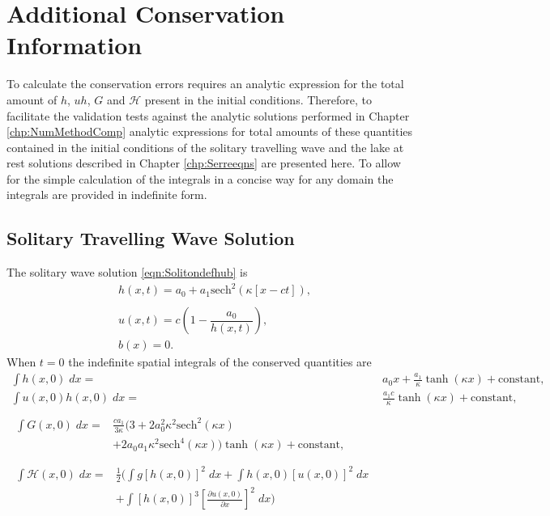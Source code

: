 \chapter{Additional Conservation Information}
\label{app:ConQuant}
To calculate the conservation errors requires an analytic expression for the total amount of $h$, $uh$, $G$ and $\mathcal{H}$ present in the initial conditions. Therefore, to facilitate the validation tests against the analytic solutions performed in Chapter \ref{chp:NumMethodComp} analytic expressions for total amounts of these quantities contained in the initial conditions of the solitary travelling wave and the lake at rest solutions described in Chapter \ref{chp:Serreeqns} are presented here. To allow for the simple calculation of the integrals in a concise way for any domain the integrals are provided in indefinite form. 

\section{Solitary Travelling Wave Solution}
The solitary wave solution \eqref{eqn:Solitondefhub} is
	\begin{align*}
	&h(x,t) = a_0 + a_1\text{sech}^2\left(\kappa \left[x - ct\right]\right), \\  \nonumber \\
	&u(x,t) = c\left(1 - \dfrac{a_0}{h(x,t)}\right), \\
	&b(x) = 0.
	\end{align*}
\begingroup
When $t=0$ the indefinite spatial integrals of the conserved quantities are
\allowdisplaybreaks
\begin{subequations}
	\begin{align}
	\int h(x,0) \; dx = {} & a_0 x + \frac{a_1}{\kappa} \tanh\left(\kappa x\right) + \text{constant}, \label{eqn:SolitonConservationh} \\
	\int u(x,0)h(x,0) \;  dx = {} & \frac{a_1 c}{\kappa} \tanh\left(\kappa x\right)+ \text{constant}, \label{eqn:SolitonConservationuh} \\  \nonumber \\
	\begin{split}
	\int G(x,0) \; dx = {}&  \frac{c a_1}{3 \kappa}  \Bigg(3 + 2a_0^2 \kappa^2\text{sech}^2\left(\kappa x\right)  \\ &+ 2a_0 a_1 \kappa^2 \text{sech}^4\left(\kappa x\right) \Bigg)\tanh\left(\kappa x\right)  + \text{constant} ,
	\end{split} \label{eqn:SolitonConservationG}
	\\  \nonumber \\
	\begin{split}
	\int \mathcal{H}(x,0) \; dx = {}&\frac{1}{2} \Bigg(\int g\left[h(x,0)\right]^2 \; dx + \int h(x,0)\left[u(x,0)\right]^2 \; dx  \\ &+ \int \left[h(x,0)\right]^3 \left[\frac{\partial u(x,0)}{\partial x}\right]^2 \; dx \Bigg) \label{eqn:SolitonConservationH}
	\end{split}
	\end{align}
	\label{eqn:SolitonConservation}
\end{subequations}

